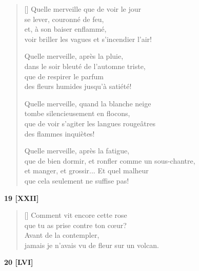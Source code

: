 \documentclass[a4paper,12pt]{book}
\begin{document}
\begin{verse}[\versewidth]
  Quelle merveille que de voir le jour \\
  se lever, couronné de feu, \\
  et, à son baiser enflammé, \\
  voir briller les vagues et s'incendier l'air!

  Quelle merveille, après la pluie, \\
  dans le soir bleuté de l'automne triste, \\
  que de respirer le parfum \\
  des fleurs humides jusqu'à satiété!

  Quelle merveille, quand la blanche neige \\
  tombe silencieusement en flocons, \\
  que de voir s'agiter les langues rougeâtres \\
  des flammes inquiètes!

  Quelle merveille, après la fatigue, \\
  que de bien dormir, et ronfler comme un sous-chantre, \\
  et manger, et grossir... Et quel malheur \\
  que cela seulement ne suffise pas!
\end{verse}

\bigskip

\begin{center}
  \textbf{19 [XXII]}
\end{center}

\settowidth{\versewidth}{Comment vit cette rose que tu as prise}

\begin{verse}[\versewidth]
  Comment vit encore cette rose \\
  que tu as prise contre ton cœur? \\
  Avant de la contempler, \\
  jamais je n'avais vu de fleur sur un volcan.
\end{verse}

\bigskip

\begin{center}
  \textbf{20 [LVI]}
\end{center}

\settowidth{\versewidth}{Aujourd'hui comme hier, demain comme aujourd'hui,}
\end{document}
